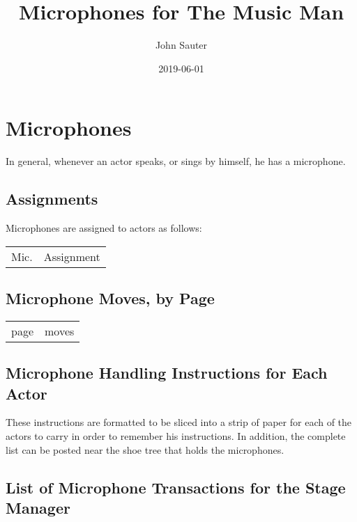 \documentclass[letterpaper]{article}
\title{Microphones for The Music Man}
\author{John Sauter}
\date{2019-06-01}
\begin{document}
\maketitle
\tableofcontents
\newpage

\section {Microphones}
In general, whenever an actor speaks, or sings by himself, he has a microphone.

\subsection {Assignments}
Microphones are assigned to actors as follows:

\begin{center}
\begin{longtable}{|l|m{7in}|}
\hline Mic. & Assignment \endhead \hline

\end{longtable}
\end{center}

\subsection {Microphone Moves, by Page}

\begin{center}
\begin{longtable}{|l|m{7in}|}
\hline page & moves \endhead \hline

\end{longtable}
\end{center}

\subsection {Microphone Handling Instructions for Each Actor}

These instructions are formatted to be sliced into a strip of paper
for each of the actors to carry in order to remember his instructions.
In addition, the complete list can be posted near the shoe tree that
holds the microphones.

\vskip 0.25in

{\setlength{\parindent}{0in}

}

\subsection {List of Microphone Transactions for the Stage Manager}
\end{document}
